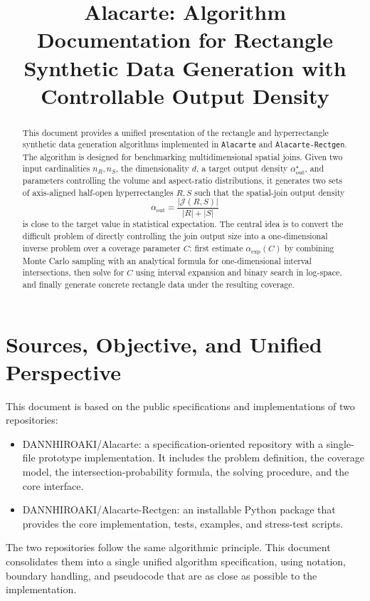 \documentclass[11pt,a4paper]{article}
\title{Alacarte: Algorithm Documentation for Rectangle Synthetic Data Generation with Controllable Output Density}
\date{}
\newcommand{\Jset}{\mathcal{J}}
\newcommand{\code}[1]{\texttt{#1}}
\begin{document}
\maketitle

\begin{abstract}
This document provides a unified presentation of the rectangle and hyperrectangle synthetic data generation algorithms implemented in \code{Alacarte} and \code{Alacarte-Rectgen}. The algorithm is designed for benchmarking multidimensional spatial joins. Given two input cardinalities $n_R,n_S$, the dimensionality $d$, a target output density $\alpha_{\mathrm{out}}^\star$, and parameters controlling the volume and aspect-ratio distributions, it generates two sets of axis-aligned half-open hyperrectangles $R,S$ such that the spatial-join output density
\[
  \alpha_{\mathrm{out}}=\frac{|\Jset(R,S)|}{|R|+|S|}
\]
is close to the target value in statistical expectation. The central idea is to convert the difficult problem of directly controlling the join output size into a one-dimensional inverse problem over a coverage parameter $C$: first estimate $\alpha_{\mathrm{exp}}(C)$ by combining Monte Carlo sampling with an analytical formula for one-dimensional interval intersections, then solve for $C$ using interval expansion and binary search in log-space, and finally generate concrete rectangle data under the resulting coverage.
\end{abstract}

\section{Sources, Objective, and Unified Perspective}

This document is based on the public specifications and implementations of two repositories:
\begin{itemize}
  \item DANNHIROAKI/Alacarte: a specification-oriented repository with a single-file prototype implementation. It includes the problem definition, the coverage model, the intersection-probability formula, the solving procedure, and the core interface.
  \item DANNHIROAKI/Alacarte-Rectgen: an installable Python package that provides the core implementation, tests, examples, and stress-test scripts.
\end{itemize}
The two repositories follow the same algorithmic principle. This document consolidates them into a single unified algorithm specification, using notation, boundary handling, and pseudocode that are as close as possible to the implementation.
\end{document}
